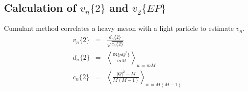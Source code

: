 \documentclass[aps, prc, reprint, amsmath, groupedaddress, nofootinbib]{revtex4-1}
\begin{document}
\begin{appendices}
\section{Calculation of $v_n\{2\}$ and $v_2\{EP\}$}
Cumulant method correlates a heavy meson with a light particle to estimate $v_n$.
\begin{eqnarray}
v_n\{2\} &=& \frac{d_n\{2\}}{\sqrt{c_n\{2\}} } \\
d_n\{2\} &=& \left\langle \frac{\Re\{pQ^*\}}{mM} \right\rangle_{w = mM} \\
c_n\{2\} &=& \left\langle \frac{|Q|^2-M}{M(M-1)} \right\rangle_{w = M(M-1)}
\end{eqnarray}
\end{appendices}
\end{document}
